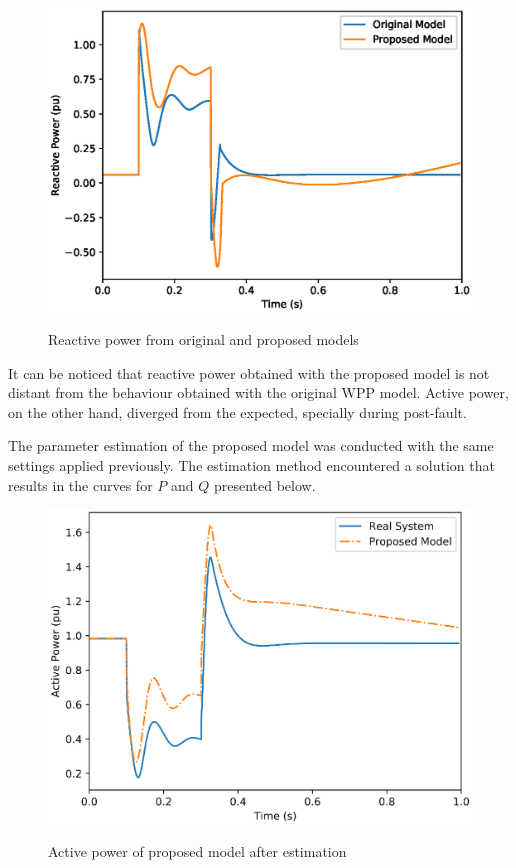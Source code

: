 \begin{figure}[!h]
	\centering
	\caption{Reactive power from original and proposed models}
	\includegraphics[scale=.7]{Images/Q_proposed.eps}
	\label{fig: proposed_Q}
\end{figure}

It can be noticed that reactive power obtained with the proposed model is not distant from the behaviour obtained with the original WPP model. Active power, on the other hand, diverged from the expected, specially during post-fault. 

The parameter estimation of the proposed model was conducted with the same settings applied previously. The estimation method encountered a solution that results in the curves for $P$ and $Q$ presented below.

\begin{figure}[!h]
	\centering
	\caption{Active power of proposed model after estimation}
	\includegraphics[scale=.7]{Images/P_proposed_estimated.eps}
	\label{fig: estimation_proposed_P}
\end{figure}

